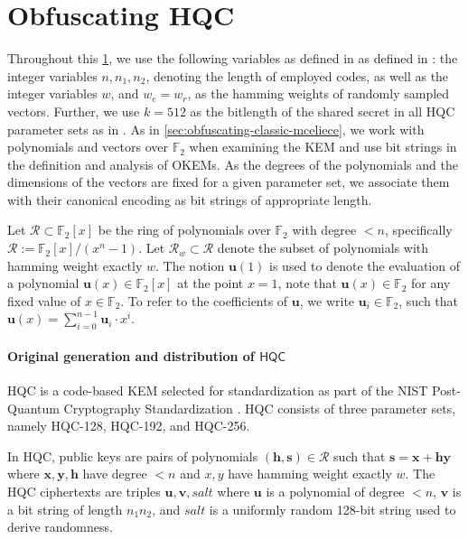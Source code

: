 \section{Obfuscating HQC} \label{sec:obfuscating-hqc}

Throughout this \cref{sec:obfuscating-hqc}, we use the following variables as defined in as defined in \cite{NISTPQC-R4:HQC22}: the integer variables $n, n_1, n_2$, denoting the length of employed codes, as well as the integer variables $w$, and $w_e = w_r$, as the hamming weights of randomly sampled vectors. Further, we use $k = 512$ as the bitlength of the shared secret in all HQC parameter sets as in \cite[Figure~3, Table~7]{NISTPQC-R4:HQC22}.
As in \cref{sec:obfuscating-classic-mceliece}, we work with polynomials and vectors over $\mathbb F_2$ when examining the KEM and use bit strings in the definition and analysis of OKEMs. As the degrees of the polynomials and the dimensions of the vectors are fixed for a given parameter set, we associate them with their canonical encoding as bit strings of appropriate length.

Let $\mathcal R \subset \mathbb{F}_2[x]$ be the ring of polynomials over $\mathbb F_2$ with degree $<n$, specifically $\mathcal R := \mathbb{F}_2[x]/(x^n-1)$. Let $\mathcal R_w \subset \mathcal R$ denote the subset of polynomials with hamming weight exactly $w$. The notion $\mathbf u(1)$ is used to denote the evaluation of a polynomial $\mathbf u(x) \in \mathbb{F}_2[x]$ at the point $x=1$, note that $\mathbf u(x) \in \mathbb{F}_2$ for any fixed value of $x \in \mathbb{F}_2$. To refer to the coefficients of $\mathbf u$, we write $\mathbf u_i \in \mathbb{F}_2$, such that $\mathbf u(x) = \sum_{i=0}^{n-1} \mathbf u_i \cdot x^i$.

\paragraph{Original generation and distribution of $\mathsf{HQC}$}

HQC is a code-based KEM selected for standardization as part of the NIST Post-Quantum Cryptography Standardization \cite{nist-standardization,nist-ir-8545}. HQC consists of three parameter sets, namely HQC-128, HQC-192, and HQC-256.

In HQC, public keys are pairs of polynomials $(\mathbf h, \mathbf s) \in \mathcal R$ such that $\mathbf s = \mathbf x + \mathbf h \mathbf y$ where $\mathbf x,\mathbf y,\mathbf h$ have degree $<n$ and $x,y$ have hamming weight exactly $w$.
The HQC ciphertexts are triples $\mathbf u,\mathbf v,\mathit{salt}$ where $\mathbf u$ is a polynomial of degree $<n$, $\mathbf v$ is a bit string of length $n_1n_2$, and $\mathit{salt}$ is a uniformly random 128-bit string used to derive randomness.

